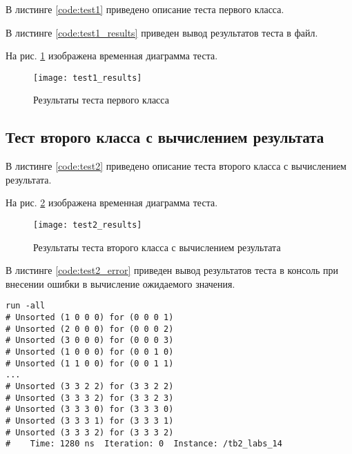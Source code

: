 В листинге \ref{code:test1} приведено описание теста первого класса.


В листинге \ref{code:test1_results} приведен вывод результатов теста в файл.


На рис. \ref{fig:test1_results} изображена временная диаграмма теста.
\vspace{-0.5cm}
\begin{figure}[H]
	\begin{center}
		\texttt{[image: test1\_results]}
		\caption{Результаты теста первого класса}
		\label{fig:test1_results}
	\end{center}
\end{figure}
\vspace{-0.5cm}

\subsection{Тест второго класса с вычислением результата}

В листинге \ref{code:test2} приведено описание теста второго класса с вычислением результата.


На рис. \ref{fig:test2_results} изображена временная диаграмма теста.
\vspace{-0.5cm}
\begin{figure}[H]
	\begin{center}
		\texttt{[image: test2\_results]}
		\caption{Результаты теста второго класса с вычислением результата}
		\label{fig:test2_results}
	\end{center}
\end{figure}	
\vspace{-0.5cm}

В листинге \ref{code:test2_error} приведен вывод результатов теста в консоль при внесении ошибки в вычисление ожидаемого значения.
\begin{lstlisting}[caption=Результаты ошибочного теста второго класса с вычислением результата, label=code:test2_error, style=console]
run -all
# Unsorted (1 0 0 0) for (0 0 0 1)
# Unsorted (2 0 0 0) for (0 0 0 2)
# Unsorted (3 0 0 0) for (0 0 0 3)
# Unsorted (1 0 0 0) for (0 0 1 0)
# Unsorted (1 1 0 0) for (0 0 1 1)
...
# Unsorted (3 3 2 2) for (3 3 2 2)
# Unsorted (3 3 3 2) for (3 3 2 3)
# Unsorted (3 3 3 0) for (3 3 3 0)
# Unsorted (3 3 3 1) for (3 3 3 1)
# Unsorted (3 3 3 2) for (3 3 3 2)
#    Time: 1280 ns  Iteration: 0  Instance: /tb2_labs_14
\end{lstlisting}
\vspace{-0.5cm}

